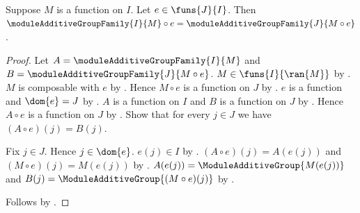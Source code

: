 \begin{theorem}\label{module_additive_group_family_reindex}
    Suppose $M$ is a function on $I$.
    Let $e\in\funs{J}{I}$.
    Then
        $\moduleAdditiveGroupFamily{I}{M}\circ e
            =\moduleAdditiveGroupFamily{J}{M\circ e}$.
\end{theorem}
\begin{proof}
    Let $A=\moduleAdditiveGroupFamily{I}{M}$ and
        $B=\moduleAdditiveGroupFamily{J}{M\circ e}$.
    $M\in\funs{I}{\ran{M}}$ by
        .
    $M$ is composable with $e$ by .
    Hence $M\circ e$ is a function on $J$ by
        .
    $e$ is a function and $\dom{e}=J$ by
        .
    $A$ is a function on $I$ and $B$ is a function on $J$ by
        .
    Hence $A\circ e$ is a function on $J$ by
        .
    Show that for every $j\in J$ we have $(A\circ e)(j)=B(j)$.
    \begin{subproof}
        Fix $j\in J$.
        Hence $j\in\dom{e}$.
        $e(j)\in I$ by .
        $(A\circ e)(j)=A(e(j))$ and
            $(M\circ e)(j)=M(e(j))$ by
            .
        $A(e(j))=\ModuleAdditiveGroup{M(e(j))}$ and
            $B(j)=\ModuleAdditiveGroup{(M\circ e)(j)}$ by
            .
    \end{subproof}
    Follows by .
\end{proof}


